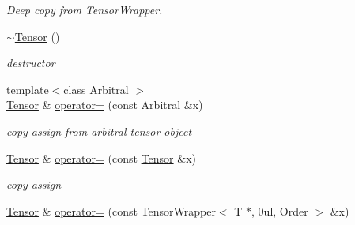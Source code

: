 \begin{DoxyCompactItemize}
\begin{DoxyCompactList}\small\item\em Deep copy from TensorWrapper. \item\end{DoxyCompactList}\item 
\hypertarget{classbtas_1_1_tensor_3_01_t_00_010ul_00_01_order_01_4_a30023558f8964344c117e212a7afbea7}{
\hyperlink{classbtas_1_1_tensor_3_01_t_00_010ul_00_01_order_01_4_a30023558f8964344c117e212a7afbea7}{$\sim$Tensor} ()}
\label{classbtas_1_1_tensor_3_01_t_00_010ul_00_01_order_01_4_a30023558f8964344c117e212a7afbea7}

\begin{DoxyCompactList}\small\item\em destructor \item\end{DoxyCompactList}\item 
\hypertarget{classbtas_1_1_tensor_3_01_t_00_010ul_00_01_order_01_4_a6f8531421077f926aa8c2750d2ef57f2}{
{\footnotesize template$<$class Arbitral $>$ }\\\hyperlink{classbtas_1_1_tensor}{Tensor} \& \hyperlink{classbtas_1_1_tensor_3_01_t_00_010ul_00_01_order_01_4_a6f8531421077f926aa8c2750d2ef57f2}{operator=} (const Arbitral \&x)}
\label{classbtas_1_1_tensor_3_01_t_00_010ul_00_01_order_01_4_a6f8531421077f926aa8c2750d2ef57f2}

\begin{DoxyCompactList}\small\item\em copy assign from arbitral tensor object \item\end{DoxyCompactList}\item 
\hypertarget{classbtas_1_1_tensor_3_01_t_00_010ul_00_01_order_01_4_a190174daf8604e3a9b84d9bd996de9f2}{
\hyperlink{classbtas_1_1_tensor}{Tensor} \& \hyperlink{classbtas_1_1_tensor_3_01_t_00_010ul_00_01_order_01_4_a190174daf8604e3a9b84d9bd996de9f2}{operator=} (const \hyperlink{classbtas_1_1_tensor}{Tensor} \&x)}
\label{classbtas_1_1_tensor_3_01_t_00_010ul_00_01_order_01_4_a190174daf8604e3a9b84d9bd996de9f2}

\begin{DoxyCompactList}\small\item\em copy assign \item\end{DoxyCompactList}\item 
\hypertarget{classbtas_1_1_tensor_3_01_t_00_010ul_00_01_order_01_4_a886446eb09a0859239f13cee6bb6d787}{
\hyperlink{classbtas_1_1_tensor}{Tensor} \& \hyperlink{classbtas_1_1_tensor_3_01_t_00_010ul_00_01_order_01_4_a886446eb09a0859239f13cee6bb6d787}{operator=} (const TensorWrapper$<$ T $\ast$, 0ul, Order $>$ \&x)}
\label{classbtas_1_1_tensor_3_01_t_00_010ul_00_01_order_01_4_a886446eb09a0859239f13cee6bb6d787}


\end{DoxyCompactItemize}
